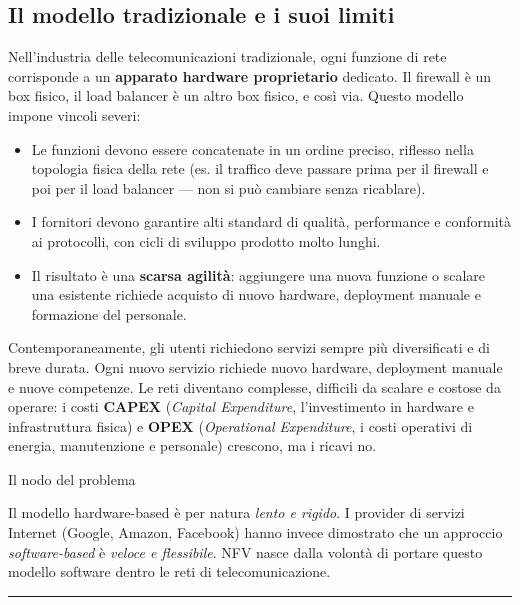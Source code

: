 \documentclass[
  italian,
  openany]{book}
\providecommand{\tightlist}{%
  \setlength{\itemsep}{0pt}\setlength{\parskip}{0pt}}
\begin{document}
\subsection{Il modello tradizionale e i suoi
limiti}\label{il-modello-tradizionale-e-i-suoi-limiti}

Nell'industria delle telecomunicazioni tradizionale, ogni funzione di
rete corrisponde a un \textbf{apparato hardware proprietario} dedicato.
Il firewall è un box fisico, il load balancer è un altro box fisico, e
così via. Questo modello impone vincoli severi:

\begin{itemize}
\tightlist
\item
  Le funzioni devono essere concatenate in un ordine preciso, riflesso
  nella topologia fisica della rete (es. il traffico deve passare prima
  per il firewall e poi per il load balancer --- non si può cambiare
  senza ricablare).
\item
  I fornitori devono garantire alti standard di qualità, performance e
  conformità ai protocolli, con cicli di sviluppo prodotto molto lunghi.
\item
  Il risultato è una \textbf{scarsa agilità}: aggiungere una nuova
  funzione o scalare una esistente richiede acquisto di nuovo hardware,
  deployment manuale e formazione del personale.
\end{itemize}

Contemporaneamente, gli utenti richiedono servizi sempre più
diversificati e di breve durata. Ogni nuovo servizio richiede nuovo
hardware, deployment manuale e nuove competenze. Le reti diventano
complesse, difficili da scalare e costose da operare: i costi
\textbf{CAPEX} (\emph{Capital Expenditure}, l'investimento in hardware e
infrastruttura fisica) e \textbf{OPEX} (\emph{Operational Expenditure},
i costi operativi di energia, manutenzione e personale) crescono, ma i
ricavi no.

\begin{calloutwarning}{Il nodo del problema}

Il modello hardware-based è per natura \emph{lento e rigido}. I provider
di servizi Internet (Google, Amazon, Facebook) hanno invece dimostrato
che un approccio \emph{software-based} è \emph{veloce e flessibile}. NFV
nasce dalla volontà di portare questo modello software dentro le reti di
telecomunicazione.

\end{calloutwarning}

\begin{center}\rule{0.5\linewidth}{0.5pt}\end{center}
\end{document}
